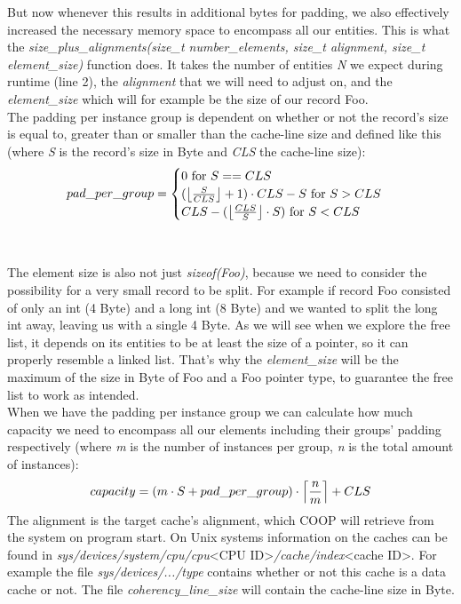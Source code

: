 But now whenever this results in additional bytes for padding, we also effectively increased the necessary memory space to encompass all our entities. This is what the \textit{size\_plus\_alignments(size\_t number\_elements, size\_t alignment, size\_t element\_size)} function does. It takes the number of entities \textit{N} we expect during runtime (line 2), the \textit{alignment} that we will need to adjust on, and the \textit{element\_size} which will for example be the size of our record Foo.\\
The padding per instance group is dependent on whether or not the record's size is equal to, greater than or smaller than the cache-line size and defined like this (where \textit{S} is the record's size in Byte and \textit{CLS} the cache-line size):
\begin{align}
pad\_per\_group = \begin{cases}
	 0\text{ for } S == CLS\\
	(\left \lfloor \frac{S}{CLS} \right \rfloor +1)\cdot CLS - S \text{ for } S > CLS\\
	CLS - (\left \lfloor \frac{CLS}{S} \right \rfloor\cdot S) \text{ for } S < CLS
\end{cases}
\end{align} \\\\
The element size is also not just \textit{sizeof(Foo)}, because we need to consider the possibility for a very small record to be split. For example if record Foo consisted of only an int (4 Byte) and a long int (8 Byte) and we wanted to split the long int away, leaving us with a single 4 Byte. As we will see when we explore the free list, it depends on its entities to be at least the size of a pointer, so it can properly resemble a linked list. That's why the \textit{element\_size} will be the maximum of the size in Byte of Foo and a Foo pointer type, to guarantee the free list to work as intended.\\
When we have the padding per instance group we can calculate how much capacity we need to encompass all our elements including their groups' padding respectively (where \textit{m} is the number of instances per group, \textit{n} is the total amount of instances):
\begin{align}
	capacity = (m\cdot S + pad\_per\_group)\cdot \left \lceil \frac{n}{m} \right \rceil+CLS
\end{align}
The alignment is the target cache's alignment, which COOP will retrieve from the system on program start. On Unix systems information on the caches can be found in \textit{sys/devices/system/cpu/cpu}<CPU ID>\textit{/cache/index}<cache ID>. For example the file \textit{sys/devices/.../type} contains whether or not this cache is a data cache or not. The file \textit{coherency\_line\_size} will contain the cache-line size in Byte.\\
